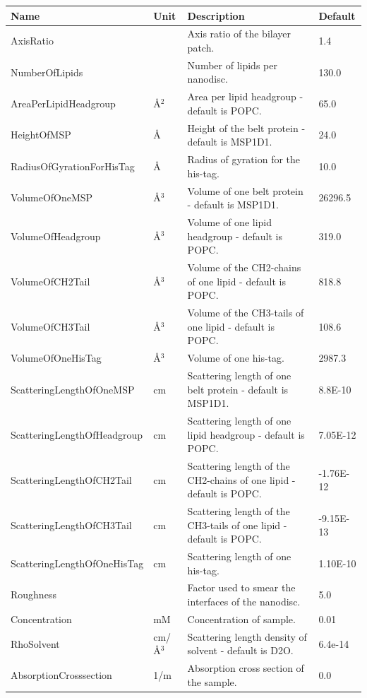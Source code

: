 \begin{longtable}{p{}p{}p{}p{}}
\toprule
\textbf{Name} & \textbf{Unit} & \textbf{Description} & \textbf{Default} \\
\midrule
\endhead
AxisRatio &  & Axis ratio of the bilayer patch. & 1.4 \\
NumberOfLipids &  & Number of lipids per nanodisc. & 130.0 \\
AreaPerLipidHeadgroup & \AA{}$^{2}$ & Area per lipid headgroup - default is POPC. & 65.0 \\
HeightOfMSP & \AA{} & Height of the belt protein - default is MSP1D1. & 24.0 \\
RadiusOfGyrationForHisTag & \AA{} & Radius of gyration for the his-tag. & 10.0 \\
VolumeOfOneMSP & \AA{}$^{3}$ & Volume of one belt protein - default is MSP1D1. & 26296.5 \\
VolumeOfHeadgroup & \AA{}$^{3}$ & Volume of one lipid headgroup - default is POPC. & 319.0 \\
VolumeOfCH2Tail & \AA{}$^{3}$ & Volume of the CH2-chains of one lipid - default is POPC. & 818.8 \\
VolumeOfCH3Tail & \AA{}$^{3}$ & Volume of the CH3-tails of one lipid - default is POPC. & 108.6 \\
VolumeOfOneHisTag & \AA{}$^{3}$ & Volume of one his-tag. & 2987.3 \\
ScatteringLengthOfOneMSP & cm & Scattering length of one belt protein - default is MSP1D1. & 8.8E-10 \\
ScatteringLengthOfHeadgroup & cm & Scattering length of one lipid headgroup - default is POPC. & 7.05E-12 \\
ScatteringLengthOfCH2Tail & cm & Scattering length of the CH2-chains of one lipid - default is POPC. & -1.76E-12 \\
ScatteringLengthOfCH3Tail & cm & Scattering length of the CH3-tails of one lipid - default is POPC. & -9.15E-13 \\
ScatteringLengthOfOneHisTag & cm & Scattering length of one his-tag. & 1.10E-10 \\
Roughness &  & Factor used to smear the interfaces of the nanodisc. & 5.0 \\
Concentration & mM & Concentration of sample. & 0.01 \\
RhoSolvent & cm/\AA{}$^{3}$ & Scattering length density of solvent - default is D2O. & 6.4e-14 \\
AbsorptionCrosssection & 1/m & Absorption cross section of the sample. & 0.0 \\

\end{longtable}
